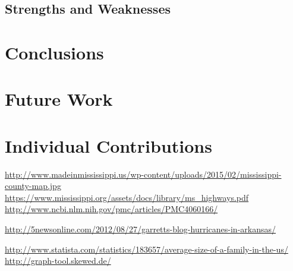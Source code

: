 \documentclass[titlepage]{article}
\begin{document}
  \subsection{Strengths and Weaknesses}

\section{Conclusions}
\label{sec:conclusions}

\section{Future Work}
\label{sec:future}

\section{Individual Contributions}
\label{sec:contributions}
  \begin{thebibliography}{9}
      \url{http://www.madeinmississippi.us/wp-content/uploads/2015/02/mississippi-county-map.jpg}
      \url{https://www.mississippi.org/assets/docs/library/ms_highways.pdf}
      \url{http://www.ncbi.nlm.nih.gov/pmc/articles/PMC4060166/}

      \url{http://5newsonline.com/2012/08/27/garretts-blog-hurricanes-in-arkansas/}

      \url{http://www.statista.com/statistics/183657/average-size-of-a-family-in-the-us/}
      \url{http://graph-tool.skewed.de/}

  \end{thebibliography}
\end{document}
